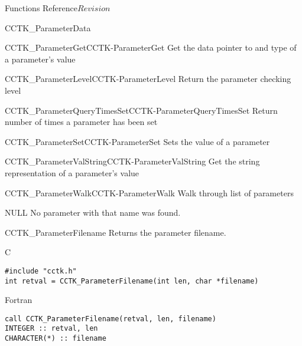 \begin{cactuspart}{ Functions Reference}{}{$Revision$}
\begin{FunctionDescription}{CCTK\_ParameterData}
\begin{SeeAlsoSection}
\begin{SeeAlso2}{CCTK\_ParameterGet}{CCTK-ParameterGet}
  Get the data pointer to and type of a parameter's value
\end{SeeAlso2}
\begin{SeeAlso2}{CCTK\_ParameterLevel}{CCTK-ParameterLevel}
  Return the parameter checking level
\end{SeeAlso2}
\begin{SeeAlso2}{CCTK\_ParameterQueryTimesSet}{CCTK-ParameterQueryTimesSet}
  Return number of times a parameter has been set
\end{SeeAlso2}
\begin{SeeAlso2}{CCTK\_ParameterSet}{CCTK-ParameterSet}
  Sets the value of a parameter
\end{SeeAlso2}
\begin{SeeAlso2}{CCTK\_ParameterValString}{CCTK-ParameterValString}
  Get the string representation of a parameter's value
\end{SeeAlso2}
\begin{SeeAlso2}{CCTK\_ParameterWalk}{CCTK-ParameterWalk}
  Walk through list of parameters
\end{SeeAlso2}
\end{SeeAlsoSection}

\begin{ErrorSection}
\begin{Error}{NULL}
No parameter with that name was found.
\end{Error}
\end{ErrorSection}
\end{FunctionDescription}


\begin{FunctionDescription}{CCTK\_ParameterFilename}
\label{CCTK-ParameterFilename}
Returns the parameter filename.

\begin{SynopsisSection}
\begin{Synopsis}{C}
\begin{verbatim}
#include "cctk.h"
int retval = CCTK_ParameterFilename(int len, char *filename)
\end{verbatim}
\end{Synopsis}
\begin{Synopsis}{Fortran}
\begin{verbatim}
call CCTK_ParameterFilename(retval, len, filename)
INTEGER :: retval, len
CHARACTER(*) :: filename
\end{verbatim}
\end{Synopsis}
\end{SynopsisSection}


\end{FunctionDescription}
\end{cactuspart}

